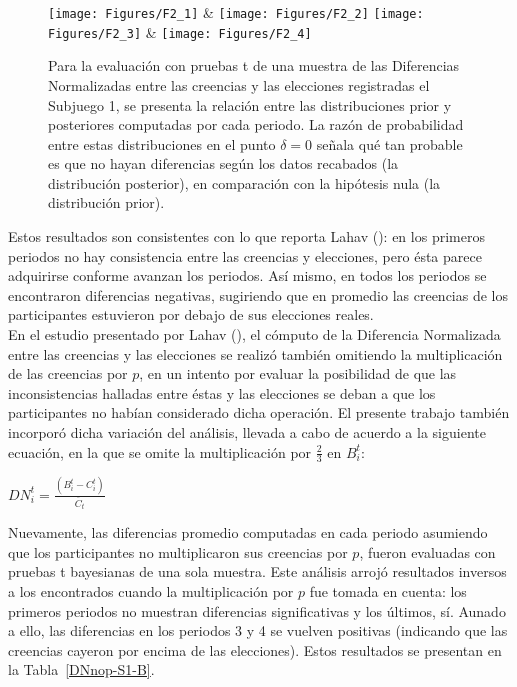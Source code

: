 \begin{figure}[h]
\centering
\texttt{[image: Figures/F2\_1]} & \texttt{[image: Figures/F2\_2]} 
\texttt{[image: Figures/F2\_3]} & \texttt{[image: Figures/F2\_4]} 
\decoRule
\caption[Diferencias Normalizadas entre creencias y elecciones en el Subjuegoo 1 (Factor de Bayes)]{Para la evaluación con pruebas t de una muestra de las Diferencias Normalizadas entre las creencias y las elecciones registradas el Subjuego 1, se presenta la relación entre las distribuciones prior y posteriores computadas por cada periodo. La razón de probabilidad entre estas distribuciones en el punto $\delta = 0$ señala qué tan probable es que no hayan diferencias según los datos recabados (la distribución posterior), en comparación con la hipótesis nula (la distribución prior).}
\label{fig:DN_S1}
\end{figure}

Estos resultados son consistentes con lo que reporta Lahav (\citeyear{Lahav}): en los primeros periodos no hay consistencia entre las creencias y elecciones, pero ésta parece adquirirse conforme avanzan los periodos. Así mismo, en todos los periodos se encontraron diferencias negativas, sugiriendo que en promedio las creencias de los participantes estuvieron por debajo de sus elecciones reales.\\

En el estudio presentado por Lahav (\citeyear{Lahav}), el cómputo de la Diferencia Normalizada entre las creencias y las elecciones se realizó también omitiendo la multiplicación de las creencias por $p$, en un intento por evaluar la posibilidad de que las inconsistencias halladas entre éstas y las elecciones se deban a que los participantes no habían considerado dicha operación. El presente trabajo también incorporó dicha variación del análisis, llevada a cabo de acuerdo a la siguiente ecuación, en la que se omite la multiplicación por $\frac{2}{3}$ en $B_i^t$:

\begin{center}
$DN_i^t =  \frac{(B_i^t - C_i^t)}{\overline{C}_t} $ \\
\end{center}

Nuevamente, las diferencias promedio computadas en cada periodo asumiendo que los participantes no multiplicaron sus creencias por $p$, fueron evaluadas con pruebas t bayesianas de una sola muestra.  Este análisis arrojó resultados inversos a los encontrados cuando la multiplicación por $p$ fue tomada en cuenta: los primeros periodos no muestran diferencias significativas y los últimos, sí.  Aunado a ello, las diferencias en los periodos 3 y 4 se vuelven positivas (indicando que las creencias cayeron por encima de las elecciones). Estos resultados se presentan en la Tabla~\ref{DNnop-S1-B}.\\


